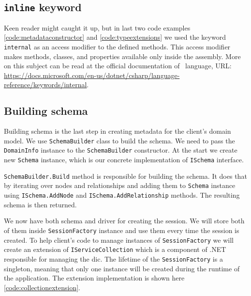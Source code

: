 \subsection{\texttt{inline} keyword}

Keen reader might caught it up, but in last two code examples \ref{code:metadataconstructor} and \ref{code:typeextensions} we used the keyword \texttt{internal}
as an access modifier to the defined methods. This access modifier makes methods, classes, and properties available only inside the assembly. More on this subject
can be read at the official documentation of \CS\ language, URL: \url{https://docs.microsoft.com/en-us/dotnet/csharp/language-reference/keywords/internal}.

\subsection {Building schema}

Building schema is the last step in creating metadata for the client's domain model.
We use \texttt{SchemaBuilder} class to build the schema. We need to pass the \texttt{DomainInfo} instance to the \texttt{SchemaBuilder} constructor.
At the start we create new \texttt{Schema} instance, which is our concrete implementation of \texttt{ISchema} interface.

\texttt{SchemaBuilder.Build} method is responsible for building the schema. It does that by iterating over nodes and relationships and adding them to \texttt{Schema} instance
using \texttt{ISchema.AddNode} and \texttt{ISchema.AddRelationship} methods. The resulting schema is then returned.

We now have both schema and driver for creating the session. We will store both of them inside \texttt{SessionFactory} instance
and use them every time the session is created. To help client's code to manage instances of \texttt{SessionFactory} we will create an extension
of \texttt{IServiceCollection} which is a component of .NET responsible for managing the \acrfull{dic}. The lifetime of the \texttt{SessionFactory} is
a singleton, meaning that only one instance will be created during the runtime of the application. The extension implementation is shown here \ref{code:collectionextension}.


